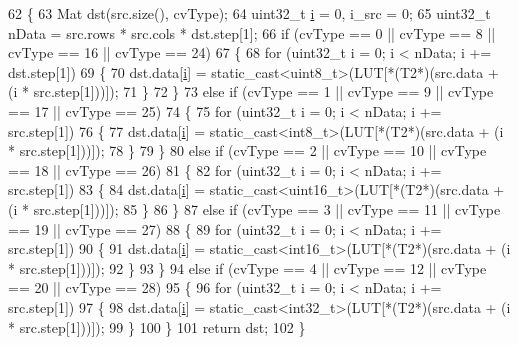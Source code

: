\begin{DoxyCode}
62         \{
63             Mat dst(src.size(), cvType);
64             uint32\_t \hyperlink{_comparision_pictures_2_createtest_image_8m_a6f6ccfcf58b31cb6412107d9d5281426}{i} = 0, i\_src = 0;
65             uint32\_t nData = src.rows * src.cols * dst.step[1];
66             \textcolor{keywordflow}{if} (cvType == 0 || cvType == 8 || cvType == 16 || cvType == 24)
67             \{
68                 \textcolor{keywordflow}{for} (uint32\_t i = 0; i < nData; i += dst.step[1])
69                 \{
70                     dst.data[\hyperlink{_comparision_pictures_2_createtest_image_8m_a6f6ccfcf58b31cb6412107d9d5281426}{i}] = \textcolor{keyword}{static\_cast<}uint8\_t\textcolor{keyword}{>}(LUT[*(T2*)(src.data + (i * src.step[1]))]);
71                 \}
72             \}
73             \textcolor{keywordflow}{else} \textcolor{keywordflow}{if} (cvType == 1 || cvType == 9 || cvType == 17 || cvType == 25)
74             \{
75                 \textcolor{keywordflow}{for} (uint32\_t i = 0; i < nData; i += src.step[1])
76                 \{
77                     dst.data[\hyperlink{_comparision_pictures_2_createtest_image_8m_a6f6ccfcf58b31cb6412107d9d5281426}{i}] = \textcolor{keyword}{static\_cast<}int8\_t\textcolor{keyword}{>}(LUT[*(T2*)(src.data + (i * src.step[1]))]);
78                 \}
79             \}
80             \textcolor{keywordflow}{else} \textcolor{keywordflow}{if} (cvType == 2 || cvType == 10 || cvType == 18 || cvType == 26)
81             \{
82                 \textcolor{keywordflow}{for} (uint32\_t i = 0; i < nData; i += src.step[1])
83                 \{
84                     dst.data[\hyperlink{_comparision_pictures_2_createtest_image_8m_a6f6ccfcf58b31cb6412107d9d5281426}{i}] = \textcolor{keyword}{static\_cast<}uint16\_t\textcolor{keyword}{>}(LUT[*(T2*)(src.data + (i * src.step[1]))]);
85                 \}
86             \}
87             \textcolor{keywordflow}{else} \textcolor{keywordflow}{if} (cvType == 3 || cvType == 11 || cvType == 19 || cvType == 27)
88             \{
89                 \textcolor{keywordflow}{for} (uint32\_t i = 0; i < nData; i += src.step[1])
90                 \{
91                     dst.data[\hyperlink{_comparision_pictures_2_createtest_image_8m_a6f6ccfcf58b31cb6412107d9d5281426}{i}] = \textcolor{keyword}{static\_cast<}int16\_t\textcolor{keyword}{>}(LUT[*(T2*)(src.data + (i * src.step[1]))]);
92                 \}
93             \}
94             \textcolor{keywordflow}{else} \textcolor{keywordflow}{if} (cvType == 4 || cvType == 12 || cvType == 20 || cvType == 28)
95             \{
96                 \textcolor{keywordflow}{for} (uint32\_t i = 0; i < nData; i += src.step[1])
97                 \{
98                     dst.data[\hyperlink{_comparision_pictures_2_createtest_image_8m_a6f6ccfcf58b31cb6412107d9d5281426}{i}] = \textcolor{keyword}{static\_cast<}int32\_t\textcolor{keyword}{>}(LUT[*(T2*)(src.data + (i * src.step[1]))]);
99                 \}
100             \}
101             \textcolor{keywordflow}{return} dst;
102         \}
\end{DoxyCode}


